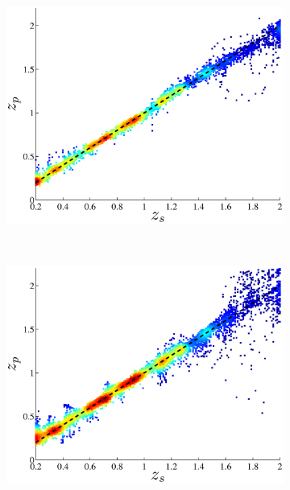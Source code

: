 \documentclass[useAMS,usenatbib,fleqn]{mn2e}
\begin{document}
\begin{figure}
\begin{subfigure}[b]{0.24\textwidth}
                \includegraphics[width=\textwidth]{figures/23_J.eps}
        \end{subfigure}
         ~
        \begin{subfigure}[b]{0.24\textwidth}
                \includegraphics[width=\textwidth]{figures/ANN_23.eps}
        \end{subfigure}
        

\end{figure}
\end{document}
